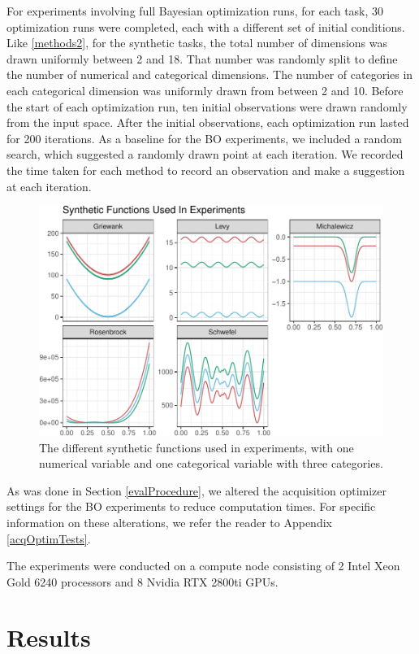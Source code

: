 \documentclass[12pt,twoside]{reedthesis}
\begin{document}
For experiments involving full Bayesian optimization runs, for each task, 30 optimization runs were completed, each with a different set of initial conditions. Like \ref{methods2}, for the synthetic tasks, the total number of dimensions was drawn uniformly between 2 and 18. That number was randomly split to define the number of numerical and categorical dimensions. The number of categories in each categorical dimension was uniformly drawn from between 2 and 10. Before the start of each optimization run, ten initial observations were drawn randomly from the input space. After the initial observations, each optimization run lasted for 200 iterations. As a baseline for the BO experiments, we included a random search, which suggested a randomly drawn point at each iteration. We recorded the time taken for each method to record an observation and make a suggestion at each iteration.
\begin{figure}
\centering
\includegraphics{thesis_files/figure-latex/experimentsfuplot-1.pdf}
\caption{\label{fig:experimentsfuplot}The different synthetic functions used in experiments, with one numerical variable and one categorical variable with three categories.}
\end{figure}
As was done in Section \ref{evalProcedure}, we altered the acquisition optimizer settings for the BO experiments to reduce computation times. For specific information on these alterations, we refer the reader to Appendix \ref{acqOptimTests}.

The experiments were conducted on a compute node consisting of 2 Intel Xeon Gold 6240 processors and 8 Nvidia RTX 2800ti GPUs.

\hypertarget{results}{%
\section{Results}\label{results}}
\end{document}
